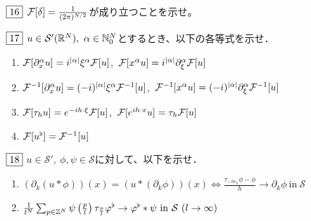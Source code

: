 \documentclass[dvipdfmx, leqno]{jsreport}
\begin{document}
\begin{tcolorbox}$\fbox{16}$
    $\mathcal{F}{[\delta]}= \frac{1}{(2\pi)^{N/2}}$が成り立つことを示せ。
\end{tcolorbox}
\begin{tcolorbox}$\fbox{17}$
    $u\in \mathcal{S}'(\mathbb{R}^N),\ \alpha\in \mathbb{N}_0^N$とするとき、以下の各等式を示せ．
\begin{enumerate}
    \item $\mathcal{F}[\partial_x^\alpha u]= i^{|\alpha|}\xi^\alpha \mathcal{F}[u]$,\ $\mathcal{F}[x^\alpha u]= i^{|\alpha|}\partial_\xi^{\alpha} \mathcal{F}[u]$
    \item $\mathcal{F}^{-1}[\partial_x^\alpha u]= (-i)^{|\alpha|}\xi^\alpha \mathcal{F}^{-1}[u]$,\ $\mathcal{F}^{-1}[x^\alpha u]= (-i)^{|\alpha|}\partial_\xi^{\alpha} \mathcal{F}^{-1}[u]$
    \item $\mathcal{F}[\tau_h u]= e^{-ih\cdot \xi}\mathcal{F}[u]$,\ $\mathcal{F}[e^{ih\cdot x} u]= \tau_h\mathcal{F}[u]$
    \item $\mathcal{F}[u^\flat]= \mathcal{F}^{-1}[u]$
\end{enumerate}
\end{tcolorbox}
\begin{tcolorbox}$\fbox{18}$
    $u\in \mathcal{S}',\ \phi, \psi\in \mathcal{S}$に対して、以下を示せ．
\begin{enumerate}
    \item $(\partial_k(u\ast \phi))(x)= (u\ast(\partial_k \phi))(x)\iff \frac{\tau_{-he_k}\phi- \phi}{h}\to \partial_k \phi \ \mathrm{in}\ \mathcal{S}$
    \item $\frac{1}{l^N}\sum_{p\in \mathbb{Z}^N}\psi\left(\frac{p}{l}\right)\tau_{\frac{p}{l}}\varphi^\flat\to \varphi^\flat\ast \psi\ \mathrm{in}\ \mathcal{S}\ (l\to \infty)$
\end{enumerate}
\end{tcolorbox}
\end{document}
